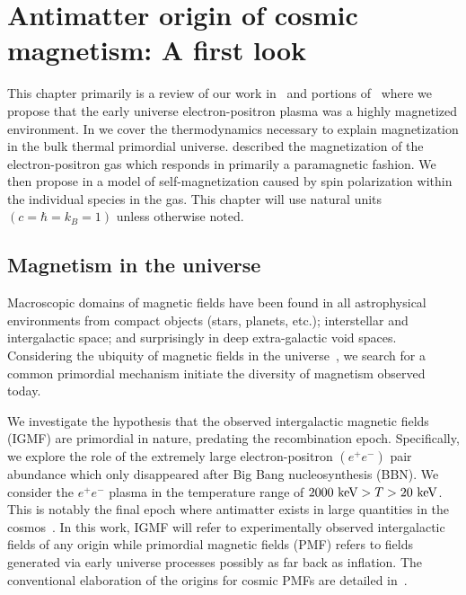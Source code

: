 \chapter{Antimatter origin of cosmic magnetism: A first look}
\label{chap:cosmo}
\noindent This chapter primarily is a review of our work in~\cite{Steinmetz:2023} and portions of~\cite{Rafelski:2023emw} where we propose that the early universe electron-positron plasma was a highly magnetized environment. In  we cover the thermodynamics necessary to explain magnetization in the bulk thermal primordial universe.  described the magnetization of the electron-positron gas which responds in primarily a paramagnetic fashion. We then propose in  a model of self-magnetization caused by spin polarization within the individual species in the gas. This chapter will use natural units $(c=\hbar=k_{B}=1)$ unless otherwise noted.

\section{Magnetism in the universe}
\label{sec:universe}
\noindent Macroscopic domains of magnetic fields have been found in all astrophysical environments from compact objects (stars, planets, etc.); interstellar and intergalactic space; and surprisingly in deep extra-galactic void spaces. Considering the ubiquity of magnetic fields in the universe~\citep{Giovannini:2017rbc,Giovannini:2003yn,Kronberg:1993vk}, we search for a common primordial mechanism initiate the diversity of magnetism observed today.

We investigate the hypothesis that the observed intergalactic magnetic fields (IGMF) are primordial in nature, predating the recombination epoch. Specifically, we explore the role of the extremely large electron-positron $(e^{+}e^{-})$ pair abundance which only disappeared after Big Bang nucleosynthesis (BBN). We consider the $e^{+}e^{-}$ plasma in the temperature range of $2000\text{ keV}>T>20\text{ keV}$. This is notably the final epoch where antimatter exists in large quantities in the cosmos~\citep{Rafelski:2023emw}. In this work, IGMF will refer to experimentally observed intergalactic fields of any origin while primordial magnetic fields (PMF) refers to fields generated via early universe processes possibly as far back as inflation. The conventional elaboration of the origins for cosmic PMFs are detailed in~\citep{Gaensler:2004gk,Durrer:2013pga,AlvesBatista:2021sln}.

